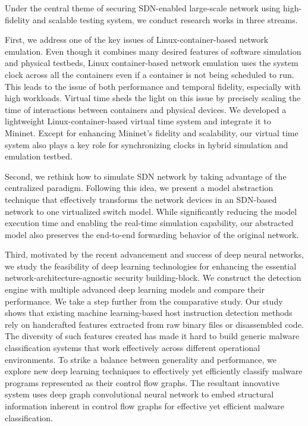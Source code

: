
Under the central theme of securing SDN-enabled large-scale network using high-fidelity and scalable testing system, we conduct research works in three streams.

First, we address one of the key issues of Linux-container-based network emulation.
Even though it combines many desired features of software simulation and physical testbeds,
Linux container-based network emulation uses the system clock across all the containers even if a container is not being scheduled to run.
This leads to the issue of both performance and temporal fidelity, especially with high workloads.
Virtual time sheds the light on this issue by precisely scaling the time of interactions between containers and physical devices.
We developed a lightweight Linux-container-based virtual time system and integrate it to Mininet.
Except for enhancing Mininet's fidelity and scalability,
our virtual time system also plays a key role for synchronizing clocks in hybrid simulation and emulation testbed.

Second, we rethink how to simulate SDN network by taking advantage of the centralized paradigm.
Following this idea, we present a model abstraction technique that effectively transforms
the network devices in an SDN-based network to one virtualized switch model.
While significantly reducing the model execution time and enabling the real-time simulation capability,
our abstracted model also preserves the end-to-end forwarding behavior of the original network.

Third, motivated by the recent advancement and success of deep neural networks,
we study the feasibility of deep learning technologies for enhancing the essential network-architecture-agnostic security building-block.
We construct the detection engine with multiple advanced deep learning models and compare their performance.
We take a step further from the comparative study.
Our study shows that existing machine learning-based host instruction detection methods rely on handcrafted features extracted from raw binary files or disassembled code.
The diversity of such features created has made it hard to build generic malware classification systems that
work effectively across different operational environments.
To strike a balance between generality and performance,
we explore new deep learning techniques to effectively yet efficiently classify malware programs represented as their control flow graphs.
The resultant innovative system uses deep graph convolutional neural network to
embed structural information inherent in control flow graphs for effective yet efficient malware classification.

